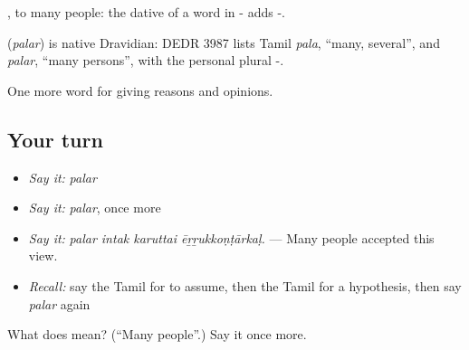 , to many people: the dative of a word in - adds -.

\begin{cousinweb}
\textbf{} (\emph{palar}) is native Dravidian: DEDR 3987 lists Tamil \emph{pala}, \textquotedblleft{}many, several\textquotedblright{}, and \emph{palar}, \textquotedblleft{}many persons\textquotedblright{}, with the personal plural -.
\end{cousinweb}

\begin{grammarlens}[title={What you've built}]
One more word for giving reasons and opinions.
\end{grammarlens}

\subsection*{Your turn}
\begin{itemize}
\raggedright
  \item \emph{Say it:} \emph{palar}
  \item \emph{Say it:} \emph{palar}, once more
  \item \emph{Say it:} \emph{palar intak karuttai ēṟṟukkoṇṭārkaḷ.} — Many people accepted this view.
  \item \emph{Recall:} say the Tamil for to assume, then the Tamil for a hypothesis, then say \emph{palar} again
\end{itemize}

\begin{tcolorbox}[breakable,colback=teal!4,colframe=teal!35!black,title={Before you move on}]
What does  mean? (\textquotedblleft{}Many people\textquotedblright{}.) Say it once more.
\end{tcolorbox}
